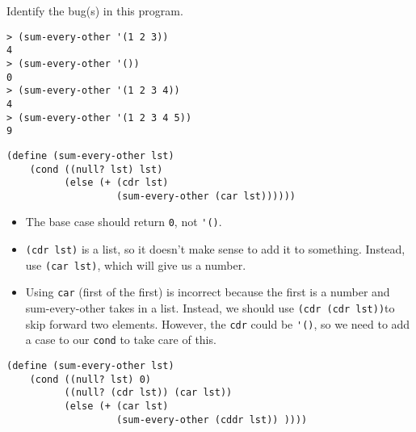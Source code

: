 \begin{blocksection}
\question Identify the bug(s) in this program.

\begin{lstlisting}
> (sum-every-other '(1 2 3))
4
> (sum-every-other '())
0
> (sum-every-other '(1 2 3 4))
4
> (sum-every-other '(1 2 3 4 5))
9
\end{lstlisting}

\begin{lstlisting}
(define (sum-every-other lst)
    (cond ((null? lst) lst)
          (else (+ (cdr lst)
                   (sum-every-other (car lst))))))
\end{lstlisting}

\begin{solution}
\begin{itemize}
\item The base case should return \lstinline$0$, not \lstinline$'()$.
\item \lstinline$(cdr lst)$ is a list, so it doesn't make sense to add it to something. 
Instead, use \lstinline$(car lst)$, which will give us a number.
\item Using \lstinline$car$ (first of the first) is incorrect because the first is a
number and sum-every-other takes in a list. Instead, we should use
\lstinline$(cdr (cdr lst))$to skip forward two elements. However, the
\lstinline$cdr$ could be \lstinline$'()$, so we need to add a case to our \lstinline$cond$
to take care of this.
\end{itemize}

\begin{lstlisting}
(define (sum-every-other lst)
    (cond ((null? lst) 0)
          ((null? (cdr lst)) (car lst))
          (else (+ (car lst)
                   (sum-every-other (cddr lst)) ))))
\end{lstlisting}
\end{solution}
\end{blocksection}
